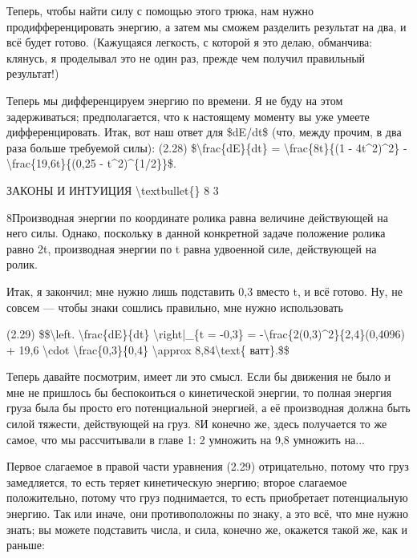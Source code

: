 \documentclass[10pt,oneside]{article}
\begin{document}
Теперь, чтобы найти силу с помощью этого трюка, нам нужно продифференцировать энергию, а затем мы сможем разделить результат на два, и всё будет готово. (Кажущаяся легкость, с которой я это делаю, обманчива: клянусь, я проделывал это не один раз, прежде чем получил правильный результат!)\par

Теперь мы дифференцируем энергию по времени. Я не буду на этом задерживаться; предполагается, что к настоящему моменту вы уже умеете дифференцировать. Итак, вот наш ответ для \$dE/dt\$ (что, между прочим, в два раза больше требуемой силы): (2.28) \$\textbackslash{}frac\{dE\}\{dt\} = \textbackslash{}frac\{8t\}\{(1 - 4t\textasciicircum{}2)\textasciicircum{}2\} - \textbackslash{}frac\{19,6t\}\{(0,25 - t\textasciicircum{}2)\textasciicircum{}\{1/2\}\}\$.\par

ЗАКОНЫ И ИНТУИЦИЯ \textbackslash{}textbullet\{\} 8 3\par

8Производная энергии по координате ролика равна величине действующей на него силы. Однако, поскольку в данной конкретной задаче положение ролика равно 2t, производная энергии по t равна удвоенной силе, действующей на ролик.\par

Итак, я закончил; мне нужно лишь подставить 0,3 вместо t, и всё готово. Ну, не совсем --- чтобы знаки сошлись правильно, мне нужно использовать\par

(2.29) \$\$\textbackslash{}left. \textbackslash{}frac\{dE\}\{dt\} \textbackslash{}right|\_\{t = -0,3\} = -\textbackslash{}frac\{2(0,3)\textasciicircum{}2\}\{2,4\}(0,4096) + 19,6 \textbackslash{}cdot \textbackslash{}frac\{0,3\}\{0,4\} \textbackslash{}approx 8,84\textbackslash{}text\{ ватт\}.\$\$\par

Теперь давайте посмотрим, имеет ли это смысл. Если бы движения не было и мне не пришлось бы беспокоиться о кинетической энергии, то полная энергия груза была бы просто его потенциальной энергией, а её производная должна быть силой тяжести, действующей на груз. 8И конечно же, здесь получается то же самое, что мы рассчитывали в главе 1: 2 умножить на 9,8 умножить на...\par

Первое слагаемое в правой части уравнения (2.29) отрицательно, потому что груз замедляется, то есть теряет кинетическую энергию; второе слагаемое положительно, потому что груз поднимается, то есть приобретает потенциальную энергию. Так или иначе, они противоположны по знаку, а это всё, что мне нужно знать; вы можете подставить числа, и сила, конечно же, окажется такой же, как и раньше:\par
\end{document}
